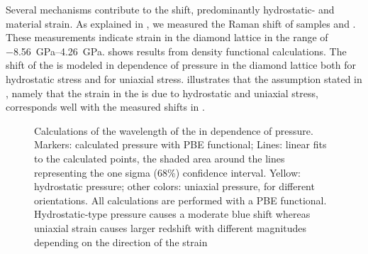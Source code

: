 	Several mechanisms contribute to the \cwl shift, predominantly hydrostatic- and material strain.
	As explained in , we measured the Raman shift of samples \insituS and \implantedTao.
	These measurements indicate strain in the diamond lattice in the range of \SIrange{-8.56}{4.26}{\giga\pascal}.
	 shows results from density functional calculations.
	The shift of the  \ZPL is modeled in dependence of pressure in the diamond lattice both for hydrostatic stress and for uniaxial stress.
	 illustrates that the assumption stated in , namely that the strain in the \nds is due to hydrostatic and uniaxial stress, corresponds well with the measured \ZPL shifts in \vl.

		\begin{figure}[!htb]
			\centering
			\caption[Calculated dependence between \siv \ZPL and lattice pressure]{Calculations of the wavelength of the \siv \ZPL in dependence of pressure. Markers: calculated pressure with PBE functional; Lines: linear fits to the calculated points, the shaded area around the lines representing the one sigma (68\%) confidence interval. Yellow: hydrostatic pressure; other colors: uniaxial pressure, for different orientations. All calculations are performed with a PBE functional. Hydrostatic-type pressure causes a moderate blue shift whereas uniaxial strain causes larger redshift with different magnitudes depending on the direction of the strain}
			\label{fig::stress_pressure}
		\end{figure}

